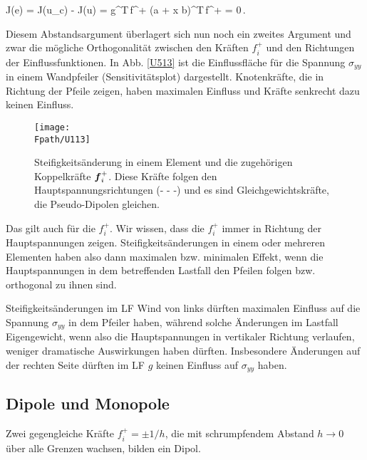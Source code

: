 {{\hspace*{-12pt}\colorbox{highlightBlue}{\parbox{0.98\textwidth}{
\beq
J(e) =  J(u_c) - J(u)  = \vek g^T\,\vek f^+ \simeq (\vek a + \vek x \times \vek b)^T\,\vek f^+ = 0\,.
\eeq
}}

Diesem \glq Abstandsargument\grq{} \"{u}berlagert sich nun noch ein zweites Argument und zwar die  m\"{o}gliche Orthogonalit\"{a}t zwischen den Kr\"{a}ften $f_i^+ $ und den Richtungen der Einflussfunktionen. In Abb. \ref{U513} ist die Einflussfl\"{a}che f\"{u}r die Spannung $\sigma_{yy}$ in einem Wandpfeiler (Sensitivit\"{a}tsplot) dargestellt. Knotenkr\"{a}fte, die in Richtung der Pfeile zeigen, haben maximalen Einfluss und Kr\"{a}fte senkrecht dazu keinen Einfluss.
\begin{figure}[tbp]
\centering
\texttt{[image: \\Fpath/U113]}
\caption{Steifigkeits\"{a}nderung in einem Element und die zugeh\"{o}rigen Koppelkr\"{a}fte $\mbox{\boldmath $f$}_i^+$. Diese Kr\"{a}fte folgen den Hauptspannungsrichtungen (- - -)  und es sind Gleichgewichtskr\"{a}fte, die Pseudo-Dipolen gleichen.}
\label{U113}
\end{figure}%

Das gilt auch f\"{u}r die $f_i^+ $. Wir wissen, dass die $f_i^+ $ immer in Richtung der Hauptspannungen zeigen. Steifigkeits\"{a}nderungen in einem oder mehreren Elementen haben also dann maximalen bzw. minimalen Effekt, wenn die Hauptspannungen in dem betreffenden Lastfall den  Pfeilen folgen bzw. orthogonal zu ihnen sind.

Steifigkeits\"{a}nderungen im LF Wind von links d\"{u}rften maximalen Einfluss auf die Spannung $\sigma_{yy} $ in dem Pfeiler haben, w\"{a}hrend solche \"{A}nderungen im Lastfall Eigengewicht, wenn also die Hauptspannungen in vertikaler Richtung verlaufen, weniger dramatische Auswirkungen haben d\"{u}rften. Insbesondere \"{A}nderungen auf der rechten Seite d\"{u}rften im LF $g$ keinen Einfluss auf $\sigma_{yy}$ haben.

\textcolor{sectionTitleBlue}{\section{Dipole und Monopole}}

Zwei gegengleiche Kr\"{a}fte $f_i^+ = \pm 1/h$, die mit schrumpfendem Abstand $h \to 0$ \"{u}ber alle Grenzen wachsen, bilden ein Dipol.

}}
